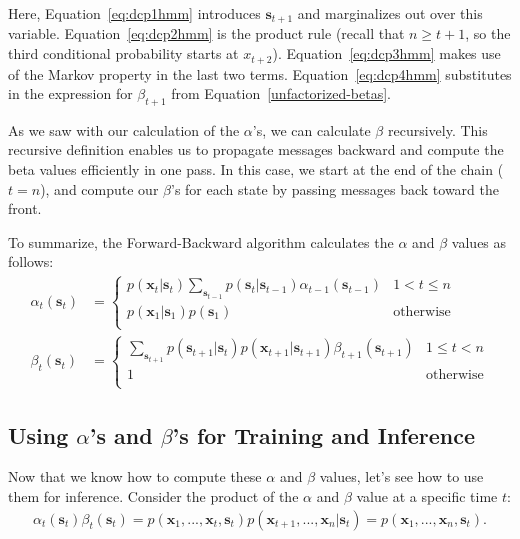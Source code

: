 Here, Equation~\eqref{eq:dcp1hmm} introduces $\textbf{s}_{t+1}$ and marginalizes out over this variable.
Equation~\eqref{eq:dcp2hmm} is the product rule (recall that $n\geq t+1$, so the third conditional probability starts at $x_{t+2}$). Equation~\eqref{eq:dcp3hmm} makes use of the Markov property in the last two terms. Equation~\eqref{eq:dcp4hmm} substitutes in the expression for $\beta_{t+1}$ from Equation~\eqref{unfactorized-betas}.

As we saw with our calculation of the $\alpha$'s, we can calculate $\beta$ recursively. This recursive definition enables us to propagate messages backward and compute the beta values
efficiently in one pass. In this case, we start at the end of the chain ($t=n$), and compute our $\beta$'s for each state by passing messages back toward the front.

To summarize, the Forward-Backward algorithm calculates the $\alpha$ and $\beta$ values as follows:\
%
\begin{align*}
	\alpha_t(\textbf{s}_t) &=
	\begin{cases} 
      p(\textbf{x}_t | \textbf{s}_t) \sum_{\textbf{s}_{t-1}} p(\textbf{s}_t | \textbf{s}_{t-1}) \alpha_{t-1}(\textbf{s}_{t-1}) & 1 < t \leq n \\
      p(\textbf{x}_1 | \textbf{s}_{1}) p(\textbf{s}_1) & \text{otherwise} \\
   \end{cases} \\
   \beta_t(\textbf{s}_t) &=
   \begin{cases} 
      \sum_{\textbf{s}_{t+1}} p(\textbf{s}_{t+1} | \textbf{s}_t) p(\textbf{x}_{t+1} | \textbf{s}_{t+1}) \beta_{t+1}(\textbf{s}_{t+1}) & 1 \leq t < n \\
      1 & \text{otherwise} \\
   \end{cases}
\end{align*}


\subsection{Using $\alpha$'s and $\beta$'s for Training and Inference}

Now that we know how to compute these $\alpha$ and $\beta$ values,
let's see how to use them for inference.
%
Consider the product of the $\alpha$ and $\beta$ value at a specific time $t$:
%
\begin{align*}
	\alpha_t(\textbf{s}_t) \beta_t(\textbf{s}_t) = p(\textbf{x}_1, ..., \textbf{x}_t, \textbf{s}_t) p(\textbf{x}_{t+1}, ..., \textbf{x}_n | \textbf{s}_t) = p(\textbf{x}_1, ..., \textbf{x}_n, \textbf{s}_t).
\end{align*}

